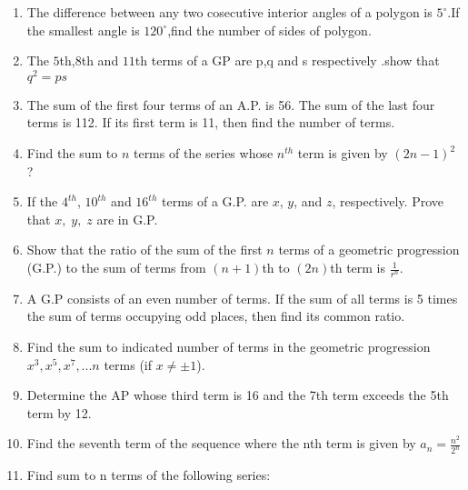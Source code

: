 \begin{enumerate}[label=\thesection.\arabic*,ref=\thesection.\theenumi]
\item The difference between any two cosecutive interior angles of a polygon is $5^\circ$.If the smallest angle is $120^\circ$,find the number of sides of polygon. \\
\solution

\pagebreak
\item The $5$th,$8$th and $11$th terms of a GP are p,q and s respectively .show that $q^2=ps$ \\
\solution

\pagebreak
\item The sum of the first four terms of an A.P. is 56. The sum of the last four terms is
 112. If its first term is 11, then find the number of terms.\\
\solution

\pagebreak
\item Find the sum to $n$ terms of the series whose $n^{th}$ term is given by $(2n-1)^2$ ? 
\solution

\pagebreak
\item If the $4^{th}$, $10^{th}$ and $16^{th}$ terms of a G.P. are $x$, $y$, and $z$, respectively. Prove that $x,\; y,\; z$ are in G.P. \\
\solution

\pagebreak
\item Show that the ratio of the sum of the first \(n\) terms of a geometric progression (G.P.) to the sum of terms from \((n+1)\)th to \((2n)\)th term is \(\frac{1}{r^n}\).
\solution
\pagebreak
\item A G.P consists of an even number of terms. If the sum of all terms is 5 times the sum of terms occupying odd places, then find its common ratio.\\
\solution

\pagebreak
\item Find the sum to indicated number of terms in the geometric progression $x^3,x^5,x^7,...n$ terms (if $x\neq\pm1$).\\
\solution

\pagebreak
\item Determine the AP whose third term is 16 and the 7th term exceeds the 5th term by 12. \\
\solution

\pagebreak
\item Find the seventh term of the sequence where the nth term is given by $a_n= \frac {n^2}{2^{n}}$\\
\solution

\pagebreak
\item Find sum to n terms of the following series:\\

\end{enumerate}
